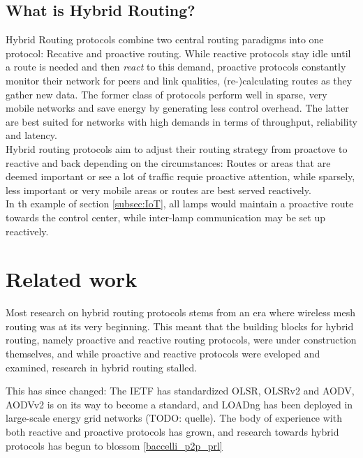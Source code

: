 \documentclass[a4paper,10pt]{scrartcl}
\begin{document}
\subsection{What is Hybrid Routing?}
\label{subsec:hybrid}
Hybrid Routing protocols combine two central routing paradigms into one protocol: Recative and proactive routing. While reactive protocols stay idle until a route is needed and then \emph{react} to this demand, proactive protocols constantly monitor their network for peers and link qualities, (re-)calculating routes as they gather new data. The former class of protocols perform well in sparse, very mobile networks and save energy by generating less control overhead. The latter are best suited for networks with high demands in terms of throughput, reliability and latency.\\
Hybrid routing protocols aim to adjust their routing strategy from proactove to reactive and back depending on the circumstances: Routes or areas that are deemed important or see a lot of traffic requie proactive attention, while sparsely, less important or very mobile areas or routes are best served reactively.\\
In th example of section \ref{subsec:IoT}, all lamps would maintain a proactive route towards the control center, while inter-lamp communication may be set up reactively.

\section{Related work}
\label{sec:related_work}

Most research on hybrid routing protocols stems from an era where wireless mesh routing was at its very beginning. This meant that the building blocks for hybrid routing, namely proactive and reactive routing protocols, were under construction themselves, and while proactive and reactive protocols were eveloped and examined, research in hybrid routing stalled. 

This has since changed: The \gls{IETF} has standardized \gls{OLSR}, OLSRv2  and \gls{AODV}, AODVv2 is on its way to become a standard, and \gls{LOADng} has been deployed in large-scale energy grid networks (TODO: quelle). The body of experience with both reactive and proactive protocols has grown, and research towards hybrid protocols has begun to blossom \ref{baccelli_p2p_prl}\\
\end{document}
